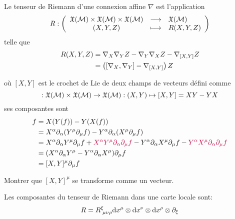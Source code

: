 \begin{theoremframe}
    \begin{defi}
        Le tenseur de Riemann d'une connexion affine $\nabla$ est l'application 
        \begin{align}
            R : \left( \begin{array}{ccl}
                \mathfrak{X} (\mathcal{M}) \times \mathfrak{X} (\mathcal{M}) \times \mathfrak{X} (\mathcal{M}) & \longrightarrow & \mathfrak{X}(\mathcal{M}) \\
                (X,Y,Z) & \longmapsto & R(X,Y,Z)
            \end{array}
            \right)
        \end{align}
        telle que
        \begin{align}
            R(X,Y,Z) &=\nabla_{X}\nabla_{Y}Z - \nabla_{Y}\nabla_{X}Z - \nabla_{[X, Y]}Z\\
            &= \left( [\nabla_X,\nabla_Y] - \nabla_{[X,Y]} \right) Z
        \end{align}
    \end{defi}
\end{theoremframe}
où $[X, Y]$ est le crochet de Lie de deux champs de vecteurs défini comme
\begin{equation}
     [\, \cdot \,,\, \cdot \,]:\Zhe(\mathcal{M})\times \Zhe(\mathcal{M}) \rightarrow \Zhe(\mathcal{M}) : (X, Y) \mapsto [X, Y]= XY -YX
\end{equation}
ses composantes sont
\begin{align}
    [X, Y]f &= X(Y(f)) - Y(X(f))\\
    &= X^{\alpha}\partial_{\alpha}(Y^{\mu}\partial_{\mu}f) - Y^{\alpha}\partial_{\alpha}(X^{\mu}\partial_{\mu}f)\\
    &= X^{\alpha}\partial_{\alpha}Y^{\mu}\partial_{\mu}f + \textcolor{purple}{X^{\alpha}Y^{\mu}\partial_{\alpha}\partial_{\mu}f} - Y^{\alpha}\partial_{\alpha}X^{\mu}\partial_{\mu}f - \textcolor{purple}{Y^{\alpha}X^{\mu}\partial_{\alpha}\partial_{\mu}f}\\
    &= (X^{\alpha}\partial_{\alpha}Y^{\mu} - Y^{\alpha}\partial_{\alpha}X^{\mu} )\partial_{\mu}f\\
    &= [X, Y]^{\mu}\partial_{\mu}f
\end{align}
\begin{exerc}
    Montrer que $[X, Y]^{\mu}$ se transforme comme un vecteur.
\end{exerc}
Les composantes du tenseur de Riemann dans une carte locale sont:
\begin{align}
    R = R\indices{^{\xi}_{\!\mu \nu \rho}}\td x^{\mu}\otimes \td x^{\nu}\otimes \td x^{\rho}\otimes \partial_{\xi}
\end{align}
